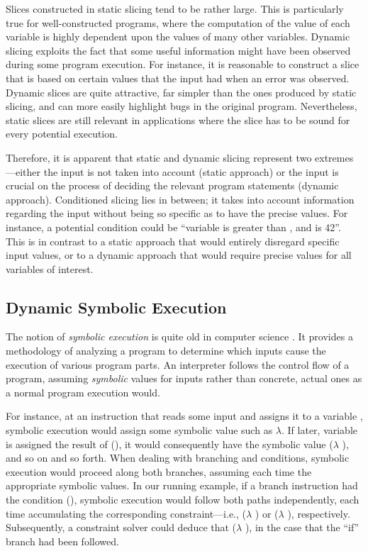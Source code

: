 Slices constructed in static slicing tend to be rather large. This is particularly true for well-constructed programs, where the computation of the value of each variable is highly dependent upon the values of many other variables. Dynamic slicing exploits the fact that some useful information might have been observed during some program execution. For instance, it is reasonable to construct a slice that is based on certain values that the input had when an error was observed. Dynamic slices are quite attractive, far simpler than the ones produced by static slicing, and can more easily highlight bugs in the original program. Nevertheless, static slices are still relevant in applications where the slice has to be sound for every potential execution.

Therefore, it is apparent that static and dynamic slicing represent two extremes---either the input is not taken into account (static approach) or the input is crucial on the process of deciding the relevant program statements (dynamic approach). Conditioned slicing lies in between; it takes into account information regarding the input without being so specific as to have the precise values. For instance, a potential condition could be ``variable  is greater than , and  is 42''. This is in contrast to a static approach that would entirely disregard specific input values, or to a dynamic approach that would require precise values for all variables of interest.


\subsection{Dynamic Symbolic Execution}

The notion of \emph{symbolic execution} is quite old in computer science \cite{article:1982:Dannenberg}. It provides a methodology of analyzing a program to determine which inputs cause the execution of various program parts. An interpreter follows the control flow of a program, assuming \emph{symbolic} values for inputs rather than concrete, actual ones as a normal program execution would.

For instance, at an instruction that reads some input and assigns it to a variable , symbolic execution would assign some symbolic value such as $\lambda$. If later, variable  is assigned the result of (), it would consequently have the symbolic value ($\lambda$ ), and so on and so forth. When dealing with branching and conditions, symbolic execution would proceed along both branches, assuming each time the appropriate symbolic values. In our running example, if a branch instruction had the condition (), symbolic execution would follow both paths independently, each time accumulating the corresponding constraint---i.e., ($\lambda$ ) or ($\lambda$ ), respectively. Subsequently, a constraint solver could deduce that ($\lambda$ ), in the case that the ``if'' branch had been followed.

